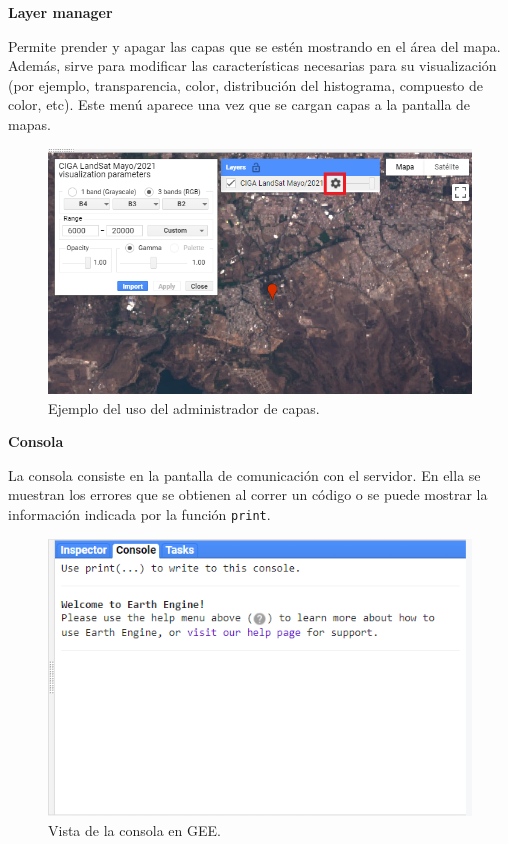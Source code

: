 \documentclass[
  12pt,
  letterpaper,
  twoside]{book}
\begin{document}
\textbf{Layer manager}

Permite prender y apagar las capas que se estén mostrando en el área del mapa. Además, sirve para modificar las características necesarias para su visualización (por ejemplo, transparencia, color, distribución del histograma, compuesto de color, etc). Este menú aparece una vez que se cargan capas a la pantalla de mapas.

\begin{figure}

{\centering \includegraphics[width=0.8\linewidth]{Img/layer} 

}

\caption{Ejemplo del uso del administrador de capas.}\label{fig:unnamed-chunk-20}
\end{figure}

\textbf{Consola}

La consola consiste en la pantalla de comunicación con el servidor. En ella se muestran los errores que se obtienen al correr un código o se puede mostrar la información indicada por la función \texttt{print}.

\begin{figure}

{\centering \includegraphics[width=0.8\linewidth]{Img/rigthPanel} 

}

\caption{Vista de la consola en GEE.}\label{fig:unnamed-chunk-21}
\end{figure}
\end{document}
